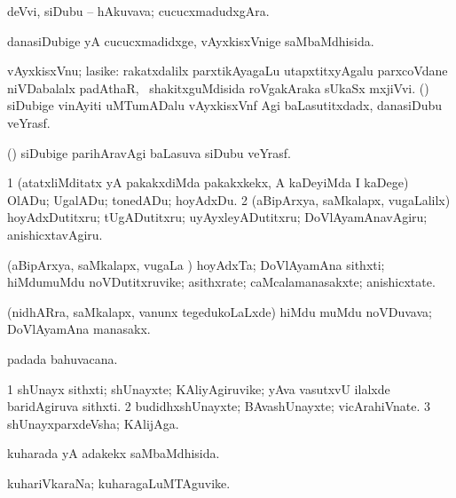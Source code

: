 \bentry
{} 
\gl{\nA}
\expl{}
\bmng
 deVvi, siDubu -- hAkuvava; cucucxmadudxgAra. 
\emng
\eentry

\bentry
{} 
\gl{\gu}
\expl{}
\bmng
 danasiDubige yA cucucxmadidxge, vAyxkisxVnige saMbaMdhisida. 
\emng
\eentry

\bentry 
{} 
\gl{\nA}
\expl{}
\bmng
vAyxkisxVnu; lasike: 
\banum
{} rakatxdalilx parxtikAyagaLu utapxtitxyAgalu parxcoVdane niVDabalalx padAthaR, \sA\ shakitxguMdisida roVgakAraka sUkaSx mxjiVvi. 
 (\ca) siDubige vinAyiti uMTumADalu vAyxkisxVnf Agi baLasutitxdadx, danasiDubu veYrasf. 
\eanum
\emng
\eentry

\bentry
{} 
\gl{\nA}
\bmng
 (\veYshA) siDubige parihAravAgi baLasuva siDubu veYrasf. 
\emng
\eentry

\bentry
{} 
\gl{\akirx}
\expl{}
\bmng
\bnum
\num{1} (atatxliMditatx yA pakakxdiMda pakakxkekx, A kaDeyiMda I kaDege) OlADu; UgalADu; tonedADu; hoyAdxDu. 
\num{2} (aBipArxya, saMkalapx, \mo vugaLalilx) hoyAdxDutitxru; tUgADutitxru; uyAyxleyADutitxru; DoVlAyamAnavAgiru; anishicxtavAgiru. 
\enum
\emng
\eentry

\bentry
{} 
\gl{\nA}
\expl{}
\bmng
 (aBipArxya, saMkalapx, \mo vugaLa \vi) hoyAdxTa; DoVlAyamAna sithxti; hiMdumuMdu noVDutitxruvike; asithxrate; caMcalamanasakxte; anishicxtate. 
\emng
\eentry

\bentry
{} 
\gl{\nA}
\expl{}
\bmng
 (nidhARra, saMkalapx, \mo vanunx tegedukoLaLxde) hiMdu muMdu noVDuvava; DoVlAyamAna manasakx. 
\emng
\eentry

\bentry
{} 
\gl{\nA}
\expl{}
\bmng
  padada bahuvacana. 
\emng
\eentry

\bentry
{} 
\gl{\nA}
\bmng
\bnum
\num{1} shUnayx sithxti; shUnayxte; KAliyAgiruvike; yAva vasutxvU ilalxde baridAgiruva sithxti. 
\num{2} budidhxshUnayxte; BAvashUnayxte; vicArahiVnate. 
\num{3} shUnayxparxdeVsha; KAlijAga. 
\enum
\emng
\eentry

\bentry
{} 
\gl{\gu}
\expl{}
\bmng
 kuharada yA adakekx saMbaMdhisida. 
\emng
\eentry

\bentry
{} 
\gl{\nA}
\expl{}
\bmng
 kuhariVkaraNa; kuharagaLuMTAguvike. 
\emng
\eentry

